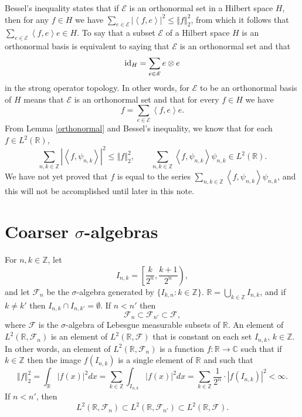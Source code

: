 \documentclass{article}
\newcommand{\inner}[2]{\left\langle #1, #2 \right\rangle}
\newcommand{\id}{\ensuremath\mathrm{id}}
\newcommand{\norm}[1]{\left\Vert #1 \right\Vert}
\theoremstyle{definition}
\theoremstyle{definition}
\begin{document}
Bessel's inequality states that if $\mathscr{E}$ is an orthonormal set in a Hilbert space $H$, then for any $f \in H$ we have
  $\sum_{e \in \mathscr{E}} |\inner{f}{e}|^2 \leq \norm{f}_2^2$, from which it follows that $\sum_{e \in \mathscr{E}} \inner{f}{e}e \in H$.
To say that a subset $\mathscr{E}$ of a Hilbert space $H$ is  an orthonormal basis is equivalent to saying that $\mathscr{E}$ is
an orthonormal set and that
\[
\id_H = \sum_{e \in \mathscr{E}} e \otimes e
\]
in the strong operator topology. In other words, for $\mathscr{E}$ to be an orthonormal basis of $H$ means that $\mathscr{E}$
is an orthonormal set and that for every
$f \in H$ we have
\[
f = \sum_{e \in \mathscr{E}} \inner{f}{e}e.
\]
From Lemma \ref{orthonormal}  and Bessel's inequality, we know that for each $f \in L^2(\mathbb{R})$,
\[
\sum_{n,k \in \mathbb{Z}} |\inner{f}{\psi_{n,k}}|^2 \leq \norm{f}_2^2, \qquad
\sum_{n,k \in \mathbb{Z}} \inner{f}{\psi_{n,k}} \psi_{n,k} \in L^2(\mathbb{R}).
\]
We have not yet  proved that $f$ is equal to the series $\sum_{n,k \in \mathbb{Z}} \inner{f}{\psi_{n,k}} \psi_{n,k}$, and this will not be accomplished until later
in this note.




\section{Coarser $\sigma$-algebras}
For $n,k \in \mathbb{Z}$, let
\[
I_{n,k} = \left[ \frac{k}{2^n}, \frac{k+1}{2^n} \right),
\]
and let $\mathscr{F}_n$ be the $\sigma$-algebra generated by $\{I_{k,n}: k \in \mathbb{Z}\}$. 
$\mathbb{R} = \bigcup_{k \in \mathbb{Z}} I_{n,k}$, and if $k \neq k'$ then $I_{n,k} \cap I_{n,k'} = \emptyset$.
 If $n < n'$ then
\[
\mathscr{F}_n \subset \mathscr{F}_{n'} \subset \mathscr{F},
\]
where $\mathscr{F}$ is the $\sigma$-algebra of Lebesgue measurable subsets of $\mathbb{R}$.
An element  of $L^2(\mathbb{R},\mathscr{F}_n)$ is an element of $L^2(\mathbb{R},\mathscr{F})$ that is constant on each set $I_{n,k}$, $k \in \mathbb{Z}$. In other words, an element
of $L^2(\mathbb{R},\mathscr{F}_n)$ is a function $f:\mathbb{R} \to \mathbb{C}$
such that if $k \in \mathbb{Z}$ then the image $f(I_{n,k})$ is a single element of $\mathbb{R}$ and such that
\[
\norm{f}_2^2=\int_{\mathbb{R}} |f(x)|^2 dx =\sum_{k \in \mathbb{Z}} \int_{I_{n,k}} |f(x)|^2 dx= \sum_{k \in \mathbb{Z}}  \frac{1}{2^n} \cdot |f(I_{n,k})|^2 < \infty.
\]
If $n<n'$, then
\[
L^2(\mathbb{R},\mathscr{F}_n) \subset L^2(\mathbb{R},\mathscr{F}_{n'}) \subset L^2(\mathbb{R},\mathscr{F}).
\]
\end{document}
